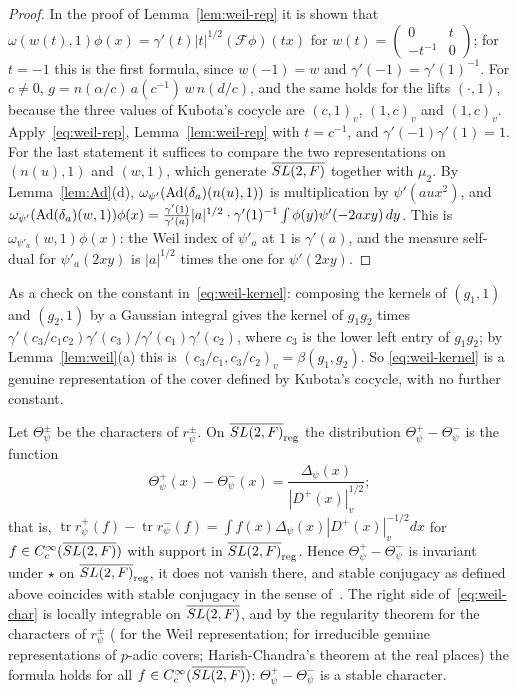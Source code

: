 \begin{proof}
In the proof of Lemma~\ref{lem:weil-rep} it is shown that
$\omega(w(t),1)\phi(x)=\gamma'(t)|t|^{1/2}(\mathcal F\phi)(tx)$ for
$w(t)=\begin{pmatrix}0&t\\-t^{-1}&0\end{pmatrix}$; for $t=-1$ this is the
first formula, since $w(-1)=w$ and $\gamma'(-1)=\gamma'(1)^{-1}$. For
$c\ne0$, $g=n(\alpha/c)\,a(c^{-1})\,w\,n(d/c)$, and the same holds for
the lifts $(\cdot,1)$, because the three values of Kubota's cocycle are
$(c,1)_v$, $(1,c)_v$ and $(1,c)_v$. Apply~\eqref{eq:weil-rep},
Lemma~\ref{lem:weil-rep} with $t=c^{-1}$, and $\gamma'(-1)\gamma'(1)=1$.
For the last statement it suffices to compare the two representations on
$(n(u),1)$ and $(w,1)$, which generate $\overline{SL(2,F)}$ together with $\mu_2$. By
Lemma~\ref{lem:Ad}(d), $\omega_{\psi'}(\operatorname{Ad}(\delta_a)(n(u),1))$ is
multiplication by $\psi'(aux^2)$, and
$\omega_{\psi'}(\operatorname{Ad}(\delta_a)(w,1))\phi(x)=\frac{\gamma'(1)}
{\gamma'(a)}|a|^{1/2}\cdot\gamma'(1)^{-1}\int\phi(y)\psi'(-2axy)\,dy$. This
is $\omega_{\psi'_a}(w,1)\phi(x)$: the Weil index of $\psi'_a$ at $1$ is
$\gamma'(a)$, and the measure self-dual for $\psi'_a(2xy)$ is $|a|^{1/2}$
times the one for $\psi'(2xy)$.
\end{proof}

As a check on the constant in~\eqref{eq:weil-kernel}: composing the
kernels of $(g_1,1)$ and $(g_2,1)$ by a Gaussian integral gives the
kernel of $g_1g_2$ times $\gamma'(c_3/c_1c_2)\gamma'(c_3)/\gamma'(c_1)
\gamma'(c_2)$, where $c_3$ is the lower left entry of $g_1g_2$; by
Lemma~\ref{lem:weil}(a) this is $(c_3/c_1,c_3/c_2)_v=\beta(g_1,g_2)$. So
\eqref{eq:weil-kernel} is a genuine representation of the cover defined
by Kubota's cocycle, with no further constant.

\begin{proposition}\label{prop:weil-char}
Let $\Theta^\pm_{\psi}$ be the characters of $r^\pm_{\psi}$. On
$\overline{SL(2,F)}_{\mathrm{reg}}$ the distribution $\Theta^+_\psi-\Theta^-_\psi$ is the
function
\begin{equation}\label{eq:weil-char}
\Theta^+_\psi(x)-\Theta^-_\psi(x)=\frac{\Delta_\psi(x)}{|D^+(x)|_v^{1/2}} ;
\end{equation}
that is, $\operatorname{tr}r^+_\psi(f)-\operatorname{tr}r^-_\psi(f)=\int
f(x)\Delta_\psi(x)|D^+(x)|_v^{-1/2}dx$ for $f\in C_c^\infty(\overline{SL(2,F)})$ with
support in $\overline{SL(2,F)}_{\mathrm{reg}}$. Hence $\Theta^+_\psi-\Theta^-_\psi$ is
invariant under $\star$ on $\overline{SL(2,F)}_{\mathrm{reg}}$, it does not vanish there,
and stable conjugacy as defined above coincides with stable conjugacy in
the sense of~\cite{Ad98,Li11}. The right side of~\eqref{eq:weil-char} is
locally integrable on $\overline{SL(2,F)}$, and by the regularity theorem for the
characters of $r^\pm_\psi$ (\cite{Ma99} for the Weil representation;
\cite[\S4]{Li12a} for irreducible genuine representations of $p$-adic
covers; Harish-Chandra's theorem at the real places) the formula holds
for all $f\in C_c^\infty(\overline{SL(2,F)})$: $\Theta^+_\psi-\Theta^-_\psi$ is a stable character.
\end{proposition}

